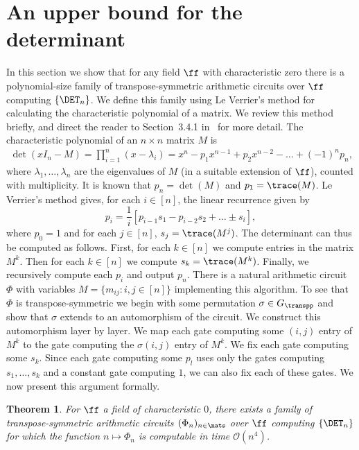 \documentclass[11pt]{article}
\newtheorem{theorem}{Theorem}[section]
\begin{document}
\section{An upper bound for the determinant}  %
\label{sec:determinant}
In this section we show that for any field $\ff$ with characteristic zero there
is a polynomial-size family of transpose-symmetric arithmetic circuits over $\ff$
computing $\{\DET_n\}$. We define this family using Le Verrier's method for
calculating the characteristic polynomial of a matrix. We review this method
briefly, and direct the reader to Section~3.4.1 in~\cite{Holm10} for more
detail.
The characteristic polynomial of an $n \times n$ matrix $M$ is
\begin{align*}
  \det(x I_n - M) = \prod^n_{i = 1} (x - \lambda_i) =
   x^n - p_1x^{n-1} + p_2 x^{n -2} - \ldots + (-1)^{n}p_n,
\end{align*}
where $\lambda_1, \ldots , \lambda_n$ are the eigenvalues of $M$ (in a suitable extension of $\ff$), counted with multiplicity.
%
%
%
It is known that $p_n = \det (M)$ and $p_1 = \trace(M)$. Le
Verrier's method gives, for each $i \in [n]$, the linear recurrence given by
$$p_i = \frac{1}{i} [p_{i -1} s_1 - p_{i -2} s_2 + \ldots \pm s_i],$$
where $p_0 = 1$ and for each $j \in [n]$, $s_j = \trace(M^j)$.
The determinant can thus be computed as follows. First, for each $k \in [n]$ we
compute entries in the matrix $M^k$. Then for each $k \in [n]$ we compute $s_k =
\trace(M^k)$. Finally, we recursively compute each $p_i$ and output $p_n$. There
is a natural arithmetic circuit $\Phi$ with variables $M = \{m_{ij} : i, j \in
[n]\}$ implementing this algorithm.
To see that $\Phi$ is transpose-symmetric we begin with some permutation $\sigma
\in G_{\transpp}$ and show that $\sigma$ extends to an automorphism of the
circuit. We construct this automorphism layer by layer. We map each gate
computing some $(i, j)$ entry of $M^k$ to the gate computing the $\sigma (i, j)$
entry of $M^k$. We fix each gate computing some $s_k$. Since each gate computing
some $p_l$ uses only the gates computing $s_1, \ldots, s_k$ and a constant gate
computing $1$, we can also fix each of these gates. We now present this argument
formally.

\begin{theorem}
  For $\ff$ %
  a field of characteristic $0$, there exists a family of transpose-symmetric
  arithmetic circuits $(\Phi_n)_{n \in \nats}$ over $\ff$ computing
  $\{\DET_n\}$ for which the function $n \mapsto \Phi_n$ is computable in time
  $\mathcal{O}(n^4)$.
  \label{thm:det-upper-bound}
\end{theorem}
\end{document}
